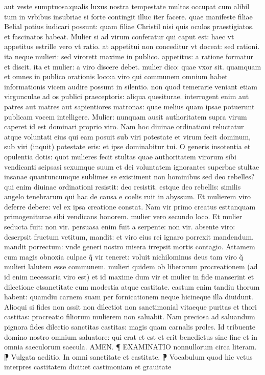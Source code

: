 \documentclass{article}
\begin{document}
\begin{pages}
aut veste sumptuosa:qualis luxus nostra tempestate multas occupat cum alibil tum in vrbibus insubriae si forte contingit illuc iter facere. quae manifeste filiae Belial potius iudicari possunt: quam filiae Christil nisi quis oculos praestigiatos. et fascinatos habeat. Mulier si ad virum conferatur qui caput est: haec vt appetitus estrille vero vt ratio. at appetitui non conceditur vt doceat: sed rationi. ita neque mulieri: sed virorett maxime in publico. appetitus: a ratione formatur et discit. ita et mulier: a viro discere debet. mulier dico: quae vxor sit. quamquam et omnes in publico orationis loco:a viro qui communem omnium habet informationis vicem audire possunt in silentio. non quod temerarie veniant etiam virgunculae ad os publici praeceptoris: aliqua quesiturae. interrogent enim aut patres aut matres aut sapientiores matronas: quae melius quam ipsae potuerunt publicam vocem intelligere. Mulier: nunquam ausit authoritatem supra virum caperet id est dominari proprio viro. Nam hoc diuinae ordinationi reluctatur atque voluntati eius qui eam posuit sub viri potestate et virum fecit dominum, sub viri (inquit) potestate eris: et ipse dominabitur tui. O generis insotentia et opulentia dotis: quot mulieres fecit stultas quae authoritatem virorum sibi vendicanti seipsasi sexumque suum et dei voluntatem ignorantes superbae stultae insanae quantuncumque sublimes se existiment non hominibus sed deo rebelles? qui enim diuinae ordinationi resistit: deo resistit. estque deo rebellis: similis angelo tenebrarum qui hac de causa e coelis ruit in abyssum. Et mulierem viro deferre debere: vel ex ipsa creatione constat. Nam vir primo creatus esttanquam primogeniturae sibi vendicans honorem. mulier vero secundo loco. Et mulier seducta fuit: non vir. persuasa enim fuit a serpente: non vir. absente viro: deserpsit fructum vetitum, mandit: et viro eius rei ignaro porrexit mandendum. mandit porrectum: vnde generi nostro misera irrepsit mortis contagio. Attamem cum magis obnoxia culpae q̃ vir teneret: voluit nichilominus deus tam viro q̃ mulieri lalutem esse communem. mulieri quidem ob liberorum procreationem (ad id enim necessaria viro est) et id maxime dum vir et mulier in fide manserint et dilectione etsanctitate cum modestia atque castitate. castum enim tandiu thorum habent: quamdiu carnem suam per fornicationem neque hicineque illa diuidunt. Alioqui si fides non assit non dilectiot non sanctimonial vitaeque puritas et thori castitas: procreatio filiorum mulierem non saluabit. Nam preciosa ad saluandum pignora fides dilectio sanctitas castitas: magis quam carnalis proles. Id tribuente domino nostro omnium saluatore: qui erat et est et erit benedictus sine fine et in omnia saeculorum saecula. AMEN.  \pend\pstart  ¶ EXAMINATIO nonnullorum circa literam. ⁋ Vulgata aeditio. In omni sanctitate et  castitate. ⁋ Vocabulum quod hic vetus interpres castitatem dicit:et castimoniam et grauitate  \pend

\end{pages}
\end{document}
